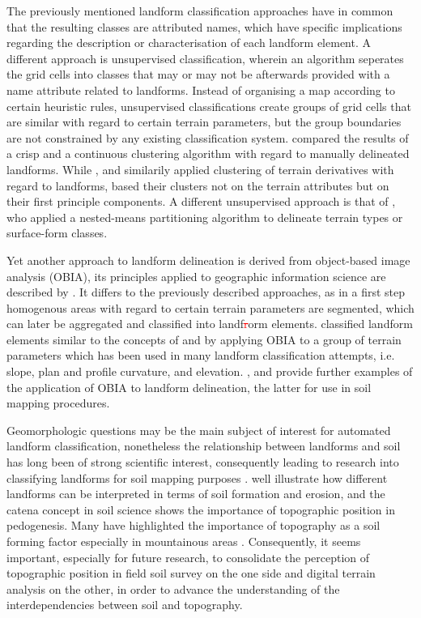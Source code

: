 \documentclass[preprint,12pt,authoryear]{elsarticle}
\begin{document}
The previously mentioned landform classification approaches have in common that the resulting classes  are attributed names, which have specific implications regarding the description or characterisation of each landform element. A different approach is unsupervised classification, wherein an algorithm seperates the grid cells into classes that may or may not be afterwards provided with a name attribute related to landforms. Instead of organising a map according to certain heuristic rules, unsupervised classifications create groups of grid cells that are similar with regard to certain terrain parameters, but the group boundaries are not constrained by any existing classification system. \cite{Irvin1997} compared the results of a crisp and a continuous clustering algorithm with regard to manually delineated landforms.  While \cite{Adediran2004}, \cite{Arrell2007} and \cite{Burrough2000a}  similarily applied clustering of terrain derivatives with regard to landforms, \cite{Moravej2012} based their clusters not on the terrain attributes but on their first principle components. A different unsupervised approach is that of  \cite{Iwahashi2007}, who applied a nested-means partitioning algorithm to delineate terrain types or surface-form classes.

Yet another approach to landform delineation is derived from object-based image analysis (OBIA), its principles applied to geographic information science are described by \cite{Blaschke2014}. It differs to the previously described approaches, as in a first step homogenous areas with regard to certain terrain parameters are segmented, which can later be aggregated and classified into landf\textcolor{red}{\sout{r}}orm elements. \cite{Dragut2006} classified landform elements similar to the concepts of \cite{Dikau1988} and \cite{Pennock1987} by applying OBIA  to a group of terrain parameters which has been used in many landform classification attempts, i.e. slope, plan and profile curvature, and  elevation. \cite{Gercek2011}, \cite{Mashimbye2014} and \cite{Kringer2009}  provide further examples of the application of OBIA to landform delineation, the latter for use in soil mapping procedures.

Geomorphologic questions may be the main subject of interest for automated landform classification, nonetheless the relationship between landforms and soil has long been of strong scientific interest, consequently leading to research into classifying landforms for soil mapping purposes \citep{Schmidt2004,Herbst2012,Hughes2009, Barringer2008}. \cite{MacMillan2000a} well illustrate how different landforms can be interpreted in terms of soil formation and erosion, and the catena concept in soil science \citep{Schaetzl2013} shows the importance of topographic position in pedogenesis. Many have highlighted the importance of topography as a soil forming factor especially in mountainous areas \citep{Geitner2011,Herbst2012}. Consequently, it seems important, especially for future research, to consolidate the perception of topographic position in field soil survey on the one side and digital terrain analysis on the other, in order to advance the understanding of the interdependencies between soil and topography.
\end{document}
